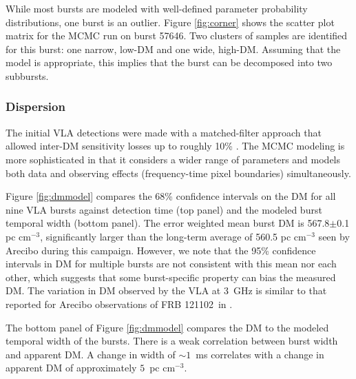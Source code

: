\documentclass[twocolumn]{aastex61}
\newcommand{\frb}{FRB 121102}
\begin{document}
While most bursts are modeled with well-defined parameter probability distributions, one burst is an outlier. Figure \ref{fig:corner} shows the scatter plot matrix \citep{corner} for the MCMC run on burst 57646. Two clusters of samples are identified for this burst: one narrow, low-DM and one wide, high-DM. Assuming that the model is appropriate, this implies that the burst can be decomposed into two subbursts.

\subsubsection{Dispersion}

The initial VLA detections were made with a matched-filter approach that allowed inter-DM sensitivity losses up to roughly 10\% \citep[$\Delta \rm{DM}=10\ \rm{pc}\ \rm{cm}^{-3}$][]{2003ApJ...596.1142C}. 
The MCMC modeling is more sophisticated in that it considers a wider range of parameters and models both data and observing effects (frequency-time pixel boundaries) simultaneously.

Figure \ref{fig:dmmodel} compares the 68\% confidence intervals on the DM for all nine VLA bursts against detection time (top panel) and the modeled burst temporal width (bottom panel). The error weighted mean burst DM is 567.8$\pm$0.1 pc cm$^{-3}$, significantly larger than the long-term average of 560.5 pc cm$^{-3}$ seen by Arecibo during this campaign. However, we note that the 95\% confidence intervals in DM for multiple bursts are not consistent with this mean nor each other, which suggests that some burst-specific property can bias the measured DM. The variation in DM observed by the VLA at 3~GHz is similar to that reported for Arecibo observations of \frb\ in \citet{2016arXiv160308880S}.

The bottom panel of Figure \ref{fig:dmmodel} compares the DM to the modeled temporal width of the bursts. There is a weak correlation between burst width and apparent DM. A change in width of $\sim1$~ms correlates with a change in apparent DM of approximately $5$~pc cm$^{-3}$.
\end{document}
